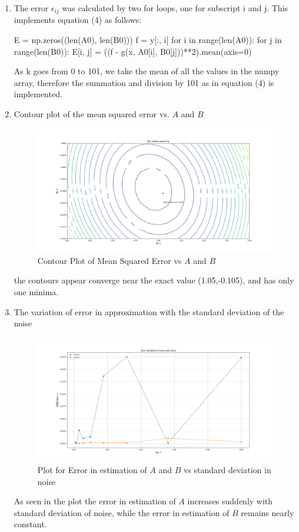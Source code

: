 \documentclass[12pt, a4paper]{report}
\begin{document}
\begin{enumerate}
\item The error $\epsilon_{ij}$ was calculated by two for loops, one for subscript i and j. This implements equation (4) as follows:
\begin{psudo}
E = np.zeros((len(A0), len(B0)))
    f = y[:, i]
    for i in range(len(A0)):
        for j in range(len(B0)):
            E[i, j] = ((f - g(x, A0[i], B0[j]))**2).mean(axis=0)
\end{psudo}
As k goes from 0 to 101, we take the mean of all the values in the numpy array, therefore the summation and division by 101 as in equation (4) is implemented.
\item Contour plot of the mean squared error vs. $A$ and $B$
\begin{figure}[H]
	\includegraphics[scale=0.35]{Figure_8.png}
	\caption{Contour Plot of Mean Squared Error vs $A$ and $B$}
	\label{fig:contour}
\end{figure}
the contours appear converge near the exact value (1.05,-0.105), and has only one minima.
\clearpage
\item The variation of error in approximation with the standard deviation of the noise
\begin{figure}[H]
	\includegraphics[scale=0.35]{Figure_10.png}
	\caption{Plot for Error in estimation of $A$ and $B$ vs standard deviation in noise}
	\label{fig:eplot}
\end{figure}
As seen in the plot the error in estimation of $A$ increases suddenly with standard deviation of noise, while the error in estimation of $B$ remains nearly constant. 


\end{enumerate}
\end{document}
